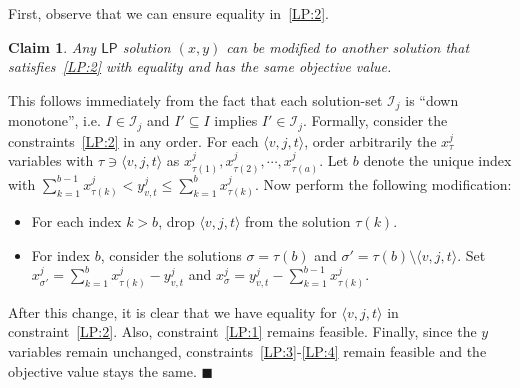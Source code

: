 \documentclass[11pt,letterpaper]{article}
\newtheorem{claim}[theorem]{Claim}
\numberwithin{algorithm}{section}
\newenvironment{proof}{

\noindent{\bf Proof:}}
{\hfill$\blacksquare$


}
\newcommand{\sse}{\subseteq}
\newcommand{\I}{{\mathcal{I}}}
\newcommand{\lp}{\ensuremath{\mathsf{LP}}\xspace}
\begin{document}
First, observe that we can ensure equality in~\eqref{LP:2}.
\begin{claim}\label{cl:xy-equality}
Any \lp solution $(x,y)$ can be modified to another solution that satisfies~\eqref{LP:2} with equality and has the same objective value.
\end{claim}
\begin{proof} This follows immediately from the fact that each solution-set $\I_j$ is ``down monotone'', i.e. $I\in\I_j$ and $I'\sse I$ implies $I'\in \I_j$. Formally, consider the constraints~\eqref{LP:2} in any order. For each $\langle v,j,t\rangle$, order arbitrarily the $x^j_\tau$ variables with $\tau \ni \langle v,j,t\rangle$ as $x^j_{\tau(1)}, x^j_{\tau(2)},\cdots,x^j_{\tau(a)}$. Let $b$ denote the unique index with $\sum_{k=1}^{b-1} x^j_{\tau(k)} < y^j_{v,t} \le \sum_{k=1}^{b} x^j_{\tau(k)}$. Now perform the following modification:
\begin{itemize}
\item For each index $k>b$, drop $\langle v,j,t\rangle$ from the solution $\tau(k)$.
\item For index $b$, consider the solutions $\sigma=\tau(b)$ and $\sigma'=\tau(b)\setminus \langle v,j,t\rangle$. Set $x^j_{\sigma'}= \sum_{k=1}^{b} x^j_{\tau(k)} - y^j_{v,t}$ and $x^j_{\sigma} = y^j_{v,t} -  \sum_{k=1}^{b-1} x^j_{\tau(k)}$.
\end{itemize}
After this change, it is clear that we have equality for
$\langle v,j,t\rangle$ in constraint~\eqref{LP:2}. Also, constraint~\eqref{LP:1} remains feasible. Finally, since the $y$ variables remain unchanged, constraints~\eqref{LP:3}-\eqref{LP:4} remain feasible and the objective value stays the same.
\end{proof}
\end{document}
